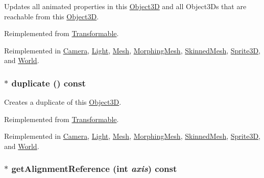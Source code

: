 Updates all animated properties in this \hyperlink{classm3g_1_1Object3D}{Object3D} and all Object3Ds that are reachable from this \hyperlink{classm3g_1_1Object3D}{Object3D}. 

Reimplemented from \hyperlink{classm3g_1_1Transformable_8aad1ceab4c2a03609c8a42324ce484d}{Transformable}.

Reimplemented in \hyperlink{classm3g_1_1Camera_8aad1ceab4c2a03609c8a42324ce484d}{Camera}, \hyperlink{classm3g_1_1Light_8aad1ceab4c2a03609c8a42324ce484d}{Light}, \hyperlink{classm3g_1_1Mesh_8aad1ceab4c2a03609c8a42324ce484d}{Mesh}, \hyperlink{classm3g_1_1MorphingMesh_8aad1ceab4c2a03609c8a42324ce484d}{MorphingMesh}, \hyperlink{classm3g_1_1SkinnedMesh_8aad1ceab4c2a03609c8a42324ce484d}{SkinnedMesh}, \hyperlink{classm3g_1_1Sprite3D_8aad1ceab4c2a03609c8a42324ce484d}{Sprite3D}, and \hyperlink{classm3g_1_1World_8aad1ceab4c2a03609c8a42324ce484d}{World}.\hypertarget{classm3g_1_1Node_0b9f7531a4b56d34f47aeb1fff0d37e0}{
\subsubsection[{duplicate}]{ $\ast$ duplicate () const}}
\label{classm3g_1_1Node_0b9f7531a4b56d34f47aeb1fff0d37e0}


Creates a duplicate of this \hyperlink{classm3g_1_1Object3D}{Object3D}. 

Reimplemented from \hyperlink{classm3g_1_1Transformable_4f64f95a34c56cb1553dc6de660dff6f}{Transformable}.

Reimplemented in \hyperlink{classm3g_1_1Camera_6279f7f8ab52af683fadd193d7694f2d}{Camera}, \hyperlink{classm3g_1_1Light_7a41af040d0c1566358d84f089cd0cd1}{Light}, \hyperlink{classm3g_1_1Mesh_52ce6d0b3eda2bd3a95bfb5b7dbb6f82}{Mesh}, \hyperlink{classm3g_1_1MorphingMesh_7e7b2c3c4c988c6341a5e249bd468f57}{MorphingMesh}, \hyperlink{classm3g_1_1SkinnedMesh_d3f422cf7656b73687d789094c7eae42}{SkinnedMesh}, \hyperlink{classm3g_1_1Sprite3D_0af34e87be803eb476f9e118d2363246}{Sprite3D}, and \hyperlink{classm3g_1_1World_efde97aaf753d48fff769d9011f187f2}{World}.\hypertarget{classm3g_1_1Node_ca338390bd2dee287fe6f5cbc4e094e1}{
\subsubsection[{getAlignmentReference}]{ $\ast$ getAlignmentReference (int {\em axis}) const}}
\label{classm3g_1_1Node_ca338390bd2dee287fe6f5cbc4e094e1}


